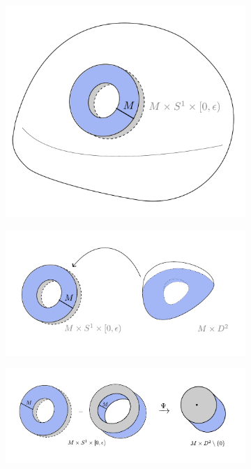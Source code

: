 \begin{figure}
    \begin{subfigure}[t]{.293\linewidth}
        \includegraphics[width=\linewidth]{images/blow_down_before.pdf}
    \end{subfigure}\hspace*{.1\linewidth}
    \begin{subfigure}[t]{.6\linewidth}
        \includegraphics[width=\linewidth]{images/blow_down_topology.pdf}
    \end{subfigure}
    \begin{subfigure}{.9\linewidth}
        \includegraphics[width=\linewidth]{images/blow_down_contact.pdf}

\end{subfigure}
\end{figure}
